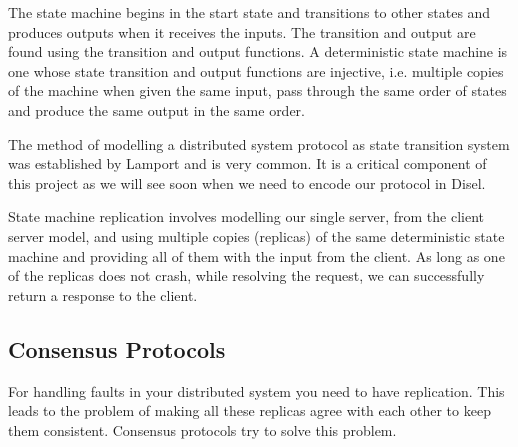 The state machine begins in the start state and transitions to other states and
produces outputs when it receives the inputs. The transition and output are found
using the transition and output functions. A deterministic state machine is one
whose state transition and output functions are injective, i.e. multiple
copies of the machine when given the same input, pass through the same order of states
and produce the same output in the same order.

The method of modelling a distributed system protocol as state transition system
was established by Lamport \cite{10} and is very common. It is a critical component
of this project as we will see soon when we need to encode our protocol in Disel.

State machine replication involves modelling our single server, from the client
server model, and using multiple copies (replicas) of the same deterministic
state machine and providing all of them with the input from the client.
As long as one of the replicas does not crash, while resolving the request,
we can successfully return a response to the client.

%

\subsection{Consensus Protocols}
For handling faults in your distributed system you need to have replication.
This leads to the problem of making all these replicas agree with each other
to keep them consistent. Consensus protocols try to solve this problem.

